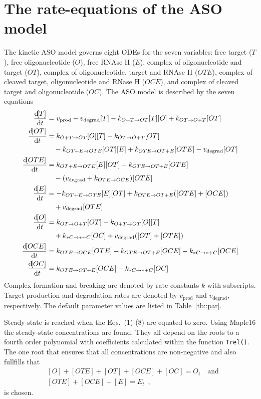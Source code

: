 \documentclass[a4paper,11pt]{article}
\newcommand{\kmo}{k_{OT \to O+T}}
\newcommand{\ko}{k_{O+T \to OT}}
\newcommand{\kmt}{k_{OTE \to OT+E}}
\newcommand{\kt}{k_{OT+E \to OTE}}
\newcommand{\kE}{k_{OTE \to OCE}}
\newcommand{\kD}{k_{*C \to *+C}}
\newcommand{\vp}{v_{\mathrm{prod}}}
\newcommand{\vd}{v_{\mathrm{degrad}}}
\begin{document}
\section{The rate-equations of the ASO model}
The kinetic ASO model governs eight ODEs for the seven variables: free target ($T$), free oligonucleotide ($O$), free RNAse H ($E$), complex of oligonucleotide and target ($OT$), complex of oligonucleotide, target and RNAse H  ($OTE$), complex of cleaved target, oligonucleotide and RNase H ($OCE$), and complex of cleaved target and oligonucleotide  ($OC$). The ASO model is described by the seven equations
\begin{align}
\frac{\dif [T]}{\dif t} &= \vp - \vd [T]-k_{O+T \to OT} [T] [O] +k_{OT\to O+T } [OT] \\
\frac{\dif [OT]}{\dif t} &= \ko[O][T]-\kmo[OT] \nonumber \\
	& \quad -\kt[OT][E]+\kmt [OTE]-\vd[OT] \\
\frac{\dif [OTE]}{\dif t} &= \kt[E][OT]-\kmt[OTE] \nonumber \\
	& \quad -(\vd+\kE)[OTE]\\
\frac{\dif [E]}{\dif t} &= -\kt[E][OT]+\kmt([OTE]+[OCE]) \nonumber \\
	& \quad+\vd[OTE]\\
\frac{\dif [O]}{\dif t}&= \kmo [OT]-\ko[O][T] \nonumber \\
	& \quad +\kD [OC]+\vd([OT]+[OTE])  \\
\frac{\dif [OCE]}{\dif t}& = \kE [OTE]-\kmt [OCE]-\kD [OCE] \\
\frac{\dif [OC]}{\dif t}& = \kmt [OCE]-\kD [OC]
\end{align}
Complex formation and breaking are denoted by rate constants $k$ with subscripts. Target production and degradation rates are denoted by $\vp$ and $\vd$, respectively. The default parameter values are listed in Table~\ref{tb::par}.


Steady-state is reached when the Eqs.~(1)-(8) are equated to zero. Using Maple16 the steady-state concentrations are found. They all depend on the roots to a fourth order polynomial with coefficients calculated within the function \texttt{Trel()}. The one root that ensures that all concentrations are non-negative and also fullfills that
\begin{align*}
 &[O]+[OTE]+[OT]+[OCE]+[OC] = O_t \quad \mathrm{and}\\ 
 &[OTE]+[OCE]+[E] = E_t \enspace,
\end{align*}
is chosen. 
\end{document}
